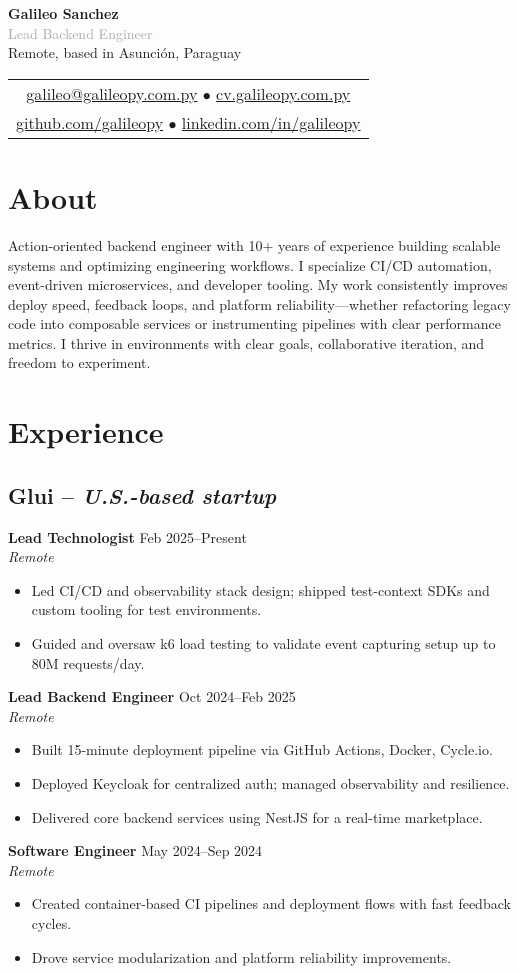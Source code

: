 \documentclass[11pt,a4paper]{article}
\newcommand{\cvheader}[5]{
  \begin{center}
    {\Huge \textbf{#1}}\\[0.4em]
    {\Large \textcolor{darkgray}{#2}}\\[1em]
    
    \textcolor{mediumgray}{#3}\\[0.6em]
    
    \begin{tabular}{c}
      \href{mailto:#4}{#4} $\bullet$ \href{https://#5}{#5}\\[0.3em]
      \href{https://github.com/galileopy}{github.com/galileopy} $\bullet$ 
      \href{https://www.linkedin.com/in/galileopy}{linkedin.com/in/galileopy}
    \end{tabular}
  \end{center}
  \vspace{1.2em}
}
\newcommand{\cvcompany}[3]{
  \subsection{#1 \textcolor{mediumgray}{#2}}
  #3
  \vspace{0.5em}
}
\newcommand{\cvrole}[4]{
  \textbf{#1} \hfill \textcolor{mediumgray}{\small #2}\\
  \textit{#3}
  \begin{itemize}
    #4
  \end{itemize}
  \vspace{0.4em}
}
\begin{document}
\cvheader{Galileo Sanchez}{Lead Backend Engineer}{Remote, based in Asunción, Paraguay}{galileo@galileopy.com.py}{cv.galileopy.com.py}

\section{About}
Action-oriented backend engineer with 10+ years of experience building scalable systems and optimizing engineering workflows. I specialize CI/CD automation, event-driven microservices, and developer tooling. My work consistently improves deploy speed, feedback loops, and platform reliability—whether refactoring legacy code into composable services or instrumenting pipelines with clear performance metrics. I thrive in environments with clear goals, collaborative iteration, and freedom to experiment.

\section{Experience}

\cvcompany{Glui}{-- \textit{U.S.-based startup}}{
  \cvrole{Lead Technologist}{Feb 2025--Present}{Remote}{
    \item Led CI/CD and observability stack design; shipped test-context SDKs and custom tooling for test environments.
    \item Guided and oversaw k6 load testing to validate event capturing setup up to 80M requests/day.
  }
  
  \cvrole{Lead Backend Engineer}{Oct 2024--Feb 2025}{Remote}{
    \item Built 15-minute deployment pipeline via GitHub Actions, Docker, Cycle.io.
    \item Deployed Keycloak for centralized auth; managed observability and resilience.
    \item Delivered core backend services using NestJS for a real-time marketplace.
  }
  
  \cvrole{Software Engineer}{May 2024--Sep 2024}{Remote}{
    \item Created container-based CI pipelines and deployment flows with fast feedback cycles.
    \item Drove service modularization and platform reliability improvements.
  }
}
\end{document}
